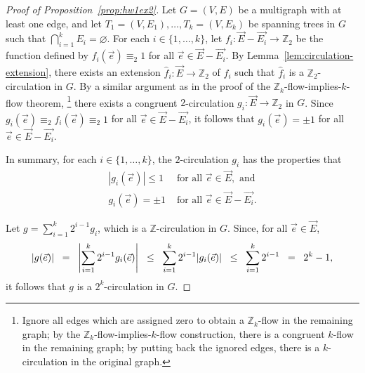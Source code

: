\begin{proof}[Proof of Proposition~\ref{prop:hw1ex2}]
    Let \(G = (V, E)\) be a multigraph with at least one edge,
    and let \(T_1 = (V, E_1), \ldots, T_k = (V, E_k)\) be spanning trees in \(G\) such that \(\bigcap_{i=1}^k E_i = \varnothing\).
    For each \(i \in \{1, \ldots, k\}\),
    let \(f_i \colon \vec{E} - \vec{E_i} \to \mathbb{Z}_2\) be the function defined by \(f_i(\vec{e}) \equiv_2 1\) for all \(\vec{e} \in \vec{E} - \vec{E_i}\).
    By Lemma~\ref{lem:circulation-extension},
    there exists an extension \(\hat{f}_i \colon \vec{E} \to \mathbb{Z}_2\) of \(f_i\) such that \(\hat{f}_i\) is a \(\mathbb{Z}_2\)-circulation in \(G\).
    By a similar argument as in the proof of the \(\mathbb{Z}_k\)-flow-implies-\(k\)-flow theorem,%
    \footnote{Ignore all edges which are assigned zero
        to obtain a \(\mathbb{Z}_k\)-flow in the remaining graph;
        by the \(\mathbb{Z}_k\)-flow-implies-\(k\)-flow construction,
        there is a congruent \(k\)-flow in the remaining graph;
        by putting back the ignored edges,
        there is a \(k\)-circulation in the original graph.}
    there exists a congruent \(2\)-circulation \(g_i \colon \vec{E} \to \mathbb{Z}_2\) in \(G\).
    Since \(g_i(\vec{e}) \equiv_2 f_i(\vec{e}) \equiv_2 1\) for all \(\vec{e} \in \vec{E} - \vec{E_i}\),
    it follows that \(g_i(\vec{e}) = \pm 1\) for all \(\vec{e} \in \vec{E} - \vec{E_i}\).

    In summary, for each \(i \in \{1, \ldots, k\}\),
    the \(2\)-circulation \(g_i\) has the properties that
    \begin{align}
        |g_i(\vec{e})| \leq 1 & \text{ for all } \vec{e} \in \vec{E}, \text{ and}                            \\
        g_i(\vec{e}) = \pm 1  & \text{ for all } \vec{e} \in \vec{E} - \vec{E_i}. \label{eq:nonzero-nontree}
    \end{align}

    Let \(g = \sum_{i=1}^k 2^{i-1} g_i\), which is a \(\mathbb{Z}\)-circulation in \(G\).
    Since, for all \(\vec{e} \in \vec{E}\),
    \begin{equation}
        \thickmuskip=15mu
        |g(\vec{e})| =
        \left|\sum_{i=1}^{k} 2^{i-1} g_i(\vec{e})\right| \leq
        \sum_{i=1}^{k} 2^{i-1} |g_i(\vec{e})| \leq
        \sum_{i=1}^{k} 2^{i-1} = 2^k - 1,
    \end{equation}
    it follows that \(g\) is a \(2^k\)-circulation in \(G\).


\end{proof}
